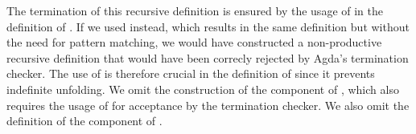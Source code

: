 The termination of this recursive definition is ensured by the usage of   in the definition of  .
If we used   instead, which results in the same definition but without the need for pattern matching, we would have constructed a non-productive recursive definition that would have been correcly rejected by Agda's termination checker.
The use of  is therefore crucial in the definition of  since it prevents indefinite unfolding.
We omit the construction of the  component of  , which also requires the usage of  for acceptance by the termination checker.
We also omit the definition of the  component of  .
\begin{code}%
\>[0]\AgdaSpace{}%
\AgdaSymbol{:}\AgdaSpace{}%
\AgdaSymbol{(}\AgdaSpace{}%
\AgdaSymbol{:}\AgdaSpace{}%
\AgdaSpace{}%
\AgdaSymbol{)}\AgdaSpace{}%
\AgdaSymbol{(}\AgdaSpace{}%
\AgdaSymbol{:}\AgdaSpace{}%
\AgdaSymbol{)}\AgdaSpace{}%
\AgdaSpace{}%
\AgdaSpace{}%
\AgdaSymbol{(}\AgdaSpace{}%
\AgdaSymbol{)}\AgdaSpace{}%
\AgdaSpace{}%
\AgdaSpace{}%
\AgdaSpace{}%
\AgdaSpace{}%
\AgdaSpace{}%
\<%
\\
\>[0]\AgdaSpace{}%
\AgdaSymbol{(}\AgdaSpace{}%
\AgdaSpace{}%
\AgdaSpace{}%
\AgdaSymbol{)}\AgdaSpace{}%
\AgdaOperator{\AgdaInductiveConstructor{[}}\AgdaSpace{}%
\AgdaSpace{}%
\AgdaOperator{\AgdaInductiveConstructor{]}}\AgdaSpace{}%
\AgdaSymbol{=}\AgdaSpace{}%
\AgdaSpace{}%
\AgdaSpace{}%
\AgdaSpace{}%
\AgdaSymbol{(}\AgdaSpace{}%
\AgdaSpace{}%
\AgdaSpace{}%
\AgdaSymbol{)}\<%
\end{code}

